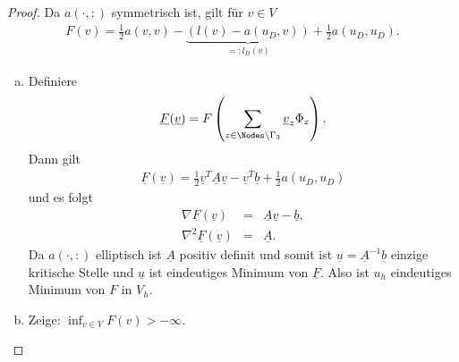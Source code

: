 \begin{proof}
    Da $a(\cdot, :)$ symmetrisch ist, gilt für $v \in V$
    \begin{eqnarray*}
          F(v)
        = \frac{1}{2} a(v, v) - \underbrace{(l(v) - a(u_D, v))}_{=: l_D(v)}
          + \frac{1}{2} a(u_D, u_D).
    \end{eqnarray*}
    \begin{enumerate}[a)]
      \item
        Definiere
        \begin{eqnarray*}
              \underline F(\underline v)
            = F\left(\sum_{z\in\Nodes \setminus \Gamma_3} \underline v_z
              \Phi_z\right).
        \end{eqnarray*}
        Dann gilt
        \begin{eqnarray*}
              \underline F(\underline v)
            = \frac{1}{2} \underline v^T \underline A \underline v - \underline
              v^T \underline b + \frac{1}{2} a(u_D, u_D)
        \end{eqnarray*}
        und es folgt
        \begin{eqnarray*}
                \nabla \underline F(\underline v)
            &=& \underline A \underline v - \underline b, \\
                \nabla^2 \underline F(\underline v)
            &=& \underline A .
        \end{eqnarray*}
        Da $a(\cdot, :)$ elliptisch ist $\underline A$ positiv definit und
        somit ist $\underline u = \underline A^{-1} \underline b$ einzige
        kritische Stelle und $\underline u$ ist eindeutiges Minimum von
        $\underline F$. Also ist $u_h$ eindeutiges Minimum von $F$ in $V_h$.
      \item
        Zeige: $\inf_{v\in V} F(v) > - \infty$.
    

\end{enumerate}
\end{proof}
